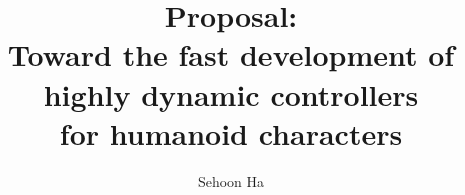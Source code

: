 \documentclass[12pt]{gatech-thesis}
\title{Proposal: \protect\\ Toward the fast development of \protect\\ highly dynamic controllers \protect\\ for humanoid characters} %
\author{Sehoon Ha}
\begin{document}


\begin{preliminary}
\contents



\end{preliminary}





\end{document}
